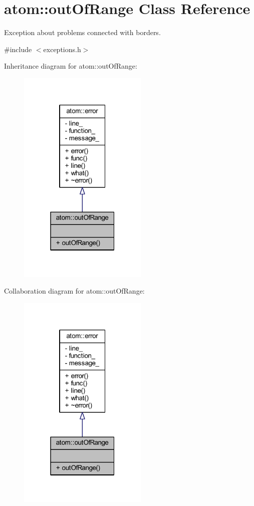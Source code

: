\hypertarget{classatom_1_1out_of_range}{}\section{atom\+:\+:out\+Of\+Range Class Reference}
\label{classatom_1_1out_of_range}


Exception about problems connected with borders.  




{\ttfamily \#include $<$exceptions.\+h$>$}



Inheritance diagram for atom\+:\+:out\+Of\+Range\+:
\nopagebreak
\begin{figure}[H]
\begin{center}
\leavevmode
\includegraphics[width=175pt]{classatom_1_1out_of_range__inherit__graph}
\end{center}
\end{figure}


Collaboration diagram for atom\+:\+:out\+Of\+Range\+:
\nopagebreak
\begin{figure}[H]
\begin{center}
\leavevmode
\includegraphics[width=175pt]{classatom_1_1out_of_range__coll__graph}
\end{center}
\end{figure}
